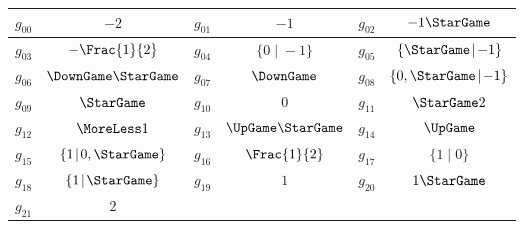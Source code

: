 \begin{tabular}{||c | c || c | c || c | c || }
\hline
$g_{00}$ & $-2$ & $g_{01}$ & $-1$ & $g_{02}$ & $-1\StarGame$ \\
\hline
$g_{03}$ & $-\Frac{1}{2}$ & $g_{04}$ & $\{0\!\mid\!-1\}$ & $g_{05}$ & $\{\StarGame\!\mid\!-1\}$ \\
\hline
$g_{06}$ & $\DownGame\StarGame$ & $g_{07}$ & $\DownGame$ & $g_{08}$ & $\{0,\StarGame\!\mid\!-1\}$ \\
\hline
$g_{09}$ & $\StarGame$ & $g_{10}$ & $0$ & $g_{11}$ & $\StarGame2$ \\
\hline
$g_{12}$ & $\MoreLess1$ & $g_{13}$ & $\UpGame\StarGame$ & $g_{14}$ & $\UpGame$ \\
\hline
$g_{15}$ & $\{1\!\mid\!0,\StarGame\}$ & $g_{16}$ & $\Frac{1}{2}$ & $g_{17}$ & $\{1\!\mid\!0\}$ \\
\hline
$g_{18}$ & $\{1\!\mid\!\StarGame\}$ & $g_{19}$ & $1$ & $g_{20}$ & $1\StarGame$ \\
\hline
$g_{21}$ & $2$ &  &  &  &  \\
\hline\end{tabular}
